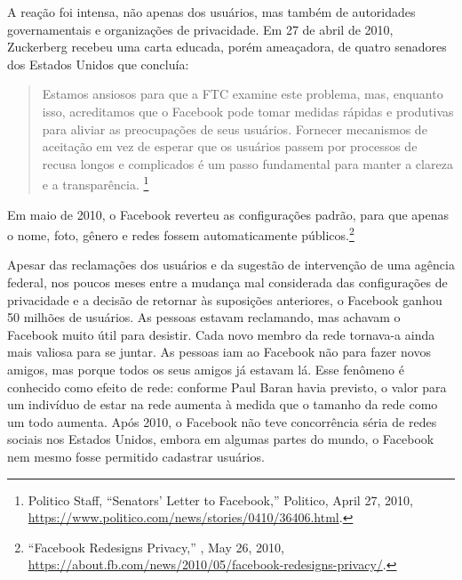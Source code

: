 A reação foi intensa, não apenas dos usuários, mas também de autoridades governamentais e
organizações de privacidade. Em 27 de abril de 2010, Zuckerberg recebeu uma carta educada, porém
ameaçadora, de quatro senadores dos Estados Unidos que concluía:

\begin{quote}
    Estamos ansiosos para que a FTC examine este problema, mas, enquanto isso, acreditamos que o
    Facebook pode tomar medidas rápidas e produtivas para aliviar as preocupações de seus usuários.
    Fornecer mecanismos de aceitação em vez de esperar que os usuários passem por processos de
    recusa longos e complicados é um passo fundamental para manter a clareza e a transparência.
    \footnote{Politico Staff, ``Senators’ Letter to Facebook,'' Politico, April 27, 2010,
    \url{https://www.politico.com/news/stories/0410/36406.html}.}
\end{quote}

Em maio de 2010, o Facebook reverteu as configurações padrão, para que apenas o nome, foto,
gênero e redes fossem automaticamente públicos.\footnote{``Facebook Redesigns Privacy,''
, May 26, 2010, \url{https://about.fb.com/news/2010/05/facebook-redesigns-privacy/}.}

Apesar das reclamações dos usuários e da sugestão de intervenção de uma agência federal, nos
poucos meses entre a mudança mal considerada das configurações de privacidade e a decisão de
retornar às suposições anteriores, o Facebook ganhou 50 milhões de usuários. As pessoas estavam
reclamando, mas achavam o Facebook muito útil para desistir. Cada novo membro da rede tornava-a
ainda mais valiosa para se juntar. As pessoas iam ao Facebook não para fazer novos amigos, mas
porque todos os seus amigos já estavam lá. Esse fenômeno é conhecido como efeito de rede: conforme
Paul Baran havia previsto, o valor para um indivíduo de estar na rede aumenta à medida que o
tamanho da rede como um todo aumenta. Após 2010, o Facebook não teve concorrência séria de redes
sociais nos Estados Unidos, embora em algumas partes do mundo, o Facebook nem mesmo fosse
permitido cadastrar usuários.

